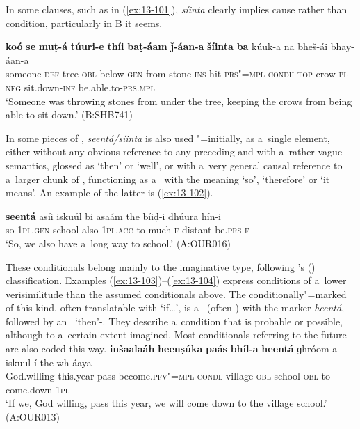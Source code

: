 In some clauses, such as in (\ref{ex:13-101}), \textit{síinta} clearly implies cause rather than condition, particularly in B it seems.

\begin{exe}
\ex
\label{ex:13-101}
\gll \textbf{koó} \textbf{se} \textbf{muṭ-á} \textbf{túuri-e} \textbf{thíi} \textbf{baṭ-áam} \textbf{ǰ-áan-a} \textbf{šíinta} \textbf{ba} kúuk-a
na bheš-ái  bhay-áan-a \\
someone \textsc{def} tree-\textsc{obl} below-\textsc{gen} from stone-\textsc{ins}  hit-\textsc{prs"=mpl} \textsc{condh} \textsc{top} crow-\textsc{pl} \textsc{neg} sit.down-\textsc{inf} be.able.to-\textsc{prs.mpl} \\
\glt `Someone was throwing stones from under the tree, keeping the crows from being able to sit down.' (B:SHB741) 
\end{exe}

In some pieces of , \textit{seentá/síinta} is also used "=initially, as a~single element, either without any obvious reference to any preceding  and with a~rather vague semantics, glossed as `then' or `well', or with a~very general causal reference to a~larger chunk of , functioning as a~ with the meaning `so', `therefore' or `it means'. An example of the latter is (\ref{ex:13-102}).

\begin{exe}
\ex
\label{ex:13-102}
\gll \textbf{seentá} asíi iskuúl bi asaám the bíiḍ-i dhúura  hín-i \\
so \textsc{1pl.gen} school also \textsc{1pl.acc} to much-\textsc{f} distant be.\textsc{prs-f} \\
\glt `So, we also have a~long way to school.' (A:OUR016) 
\end{exe}

 These conditionals belong mainly to the imaginative type, following \citeauthor{thompsonetal2007}'s (\citeyear[259--260]{thompsonetal2007}) classification. Examples (\ref{ex:13-103})--(\ref{ex:13-104}) express conditions of a~lower verisimilitude than the assumed conditionals above. The conditionally"=marked  of this kind, often translatable with `if{\ldots}', is a~ (often )  with the  marker \textit{heentá}, followed by an~ `then'-. They describe a~condition that is probable or possible, although to a~certain extent imagined. Most conditionals referring to the future are also coded this way.
\ea
\label{ex:13-103}
\gll \textbf{inšaalaáh} \textbf{heenṣúka} \textbf{paás} \textbf{bhíl-a} \textbf{heentá} ɡhróom-a iskuul-í the wh-áaya\\
God.willing this.year pass become.\textsc{pfv"=mpl} \textsc{condl} village-\textsc{obl} school-\textsc{obl} to come.down-\textsc{1pl}\\
\glt `If we, God willing, pass this year, we will come down to the village school.' (A:OUR013)

